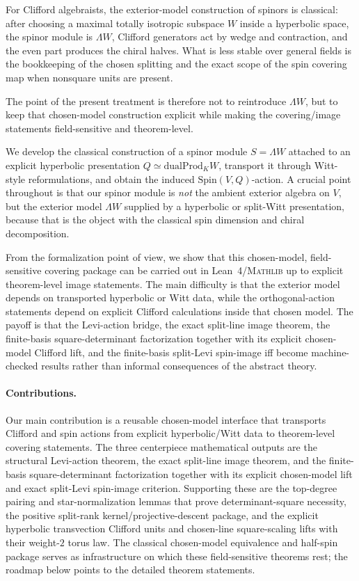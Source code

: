 \documentclass{birkjour}
\theoremstyle{plain}
\theoremstyle{definition}
\theoremstyle{remark}
\newcommand{\Spin}{\mathrm{Spin}}
\newcommand{\dualProd}{\mathrm{dualProd}}
\newcommand{\wedgeW}{\Lambda W}
\newcommand{\Lean}{Lean~4\xspace}
\newcommand{\Mathlib}{\textsc{Mathlib}\xspace}
\begin{document}
For Clifford algebraists, the exterior-model construction of spinors is
classical: after choosing a maximal totally isotropic subspace $W$ inside a
hyperbolic space, the spinor module is $\wedgeW$, Clifford generators act
by wedge and contraction, and the even part produces the chiral halves. What is
less stable over general fields is the bookkeeping of the chosen splitting and
the exact scope of the spin covering map when nonsquare units are present.

The point of the present treatment is therefore not to reintroduce
$\wedgeW$, but to keep that chosen-model construction explicit while making
the covering/image statements field-sensitive and theorem-level.

We develop the classical construction of a spinor
module $S=\wedgeW$ attached to an explicit hyperbolic presentation
$Q \simeq \dualProd_K W$, transport it through Witt-style reformulations, and
obtain the induced $\Spin(V,Q)$-action. A crucial point throughout is that our
spinor module is \emph{not} the ambient exterior algebra on $V$, but
the exterior model $\wedgeW$ supplied by a hyperbolic or split-Witt
presentation, because that is the object with the classical spin dimension and
chiral decomposition.

From the formalization point of view, we show that this chosen-model,
field-sensitive covering package can be carried out in \Lean/\Mathlib up to
explicit theorem-level image statements. The main
difficulty is that the exterior model depends on transported hyperbolic or Witt
data, while the orthogonal-action statements depend on explicit Clifford
calculations inside that chosen model. The payoff is that the Levi-action
bridge, the exact split-line image theorem, the finite-basis square-determinant
factorization together with its explicit chosen-model Clifford lift, and the
finite-basis split-Levi spin-image iff become machine-checked results rather
than informal consequences of the abstract theory.

\paragraph{Contributions.}
Our main contribution is a reusable chosen-model interface that transports
Clifford and spin actions from explicit hyperbolic/Witt data to theorem-level
covering statements. The three centerpiece mathematical outputs are the
structural Levi-action theorem, the exact split-line image theorem, and the
finite-basis square-determinant factorization together with its explicit
chosen-model lift and exact split-Levi spin-image criterion. Supporting these
are the top-degree pairing and star-normalization lemmas that prove
determinant-square necessity, the positive split-rank kernel/projective-descent
package, and the explicit hyperbolic transvection Clifford units and chosen-line
square-scaling lifts with their weight-$2$ torus law. The classical
chosen-model equivalence and half-spin package serves as infrastructure on
which these field-sensitive theorems rest; the roadmap below points to the
detailed theorem statements.
\end{document}
